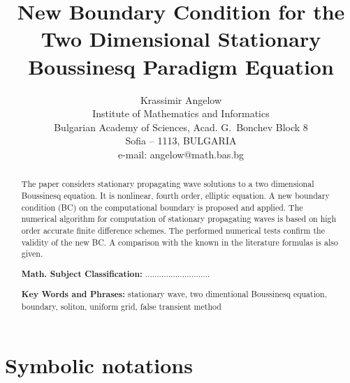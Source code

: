\documentclass[12pt]{article}
\theoremstyle{theorem}
\theoremstyle{defi}
\begin{document}

\title{New Boundary Condition for the Two Dimensional Stationary Boussinesq Paradigm Equation}

\author{Krassimir Angelow  \\[6pt]
Institute of Mathematics and Informatics\\
Bulgarian Academy of Sciences, Acad. G.~Bonchev Block 8\\
Sofia -- 1113, BULGARIA\\
e-mail: angelow@math.bas.bg\\[6pt] }

\maketitle

\begin{abstract}

The paper considers stationary propagating wave solutions to a two dimensional Boussinesq equation. It is nonlinear, fourth order, elliptic equation. A new boundary condition (BC) on the computational boundary is proposed and applied. The numerical algorithm for computation of stationary propagating waves is based on high order accurate finite difference schemes. The performed numerical tests confirm the validity of the new BC. A comparison with the known in the literature formulas is also given.

\medskip

{\bf Math. Subject Classification:} ............................  %

{\bf Key Words and Phrases:} stationary wave, two dimentional Boussinesq equation, boundary, soliton, uniform grid, false transient method

\end{abstract}

\section{Symbolic notations}
\end{document}
